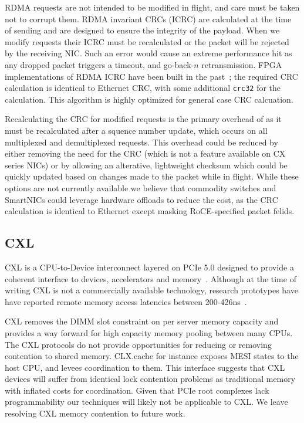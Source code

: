 RDMA requests are not intended to be modified in flight, and care must
be taken not to corrupt them. RDMA invariant CRCs (ICRC) are
calculated at the time of sending and are designed to ensure the
integrity of the payload. When we modify requests their ICRC must be
recalculated or the packet will be rejected by the receiving NIC. Such
an error would cause an extreme performance hit as any dropped packet
triggers a timeout, and go-back-$n$ retransmission.  FPGA
implementations of RDMA ICRC have been built in the
past~\cite{Mansour_2019}; the required CRC calculation is identical to
Ethernet CRC, with some additional \texttt{crc32} for the
calculation. This algorithm is highly optimized for general case CRC
calcuation.

Recalculating the CRC for modified requests is the primary overhead of
{\sword} as it must be recalculated after a squence number update,
which occurs on all multiplexed and demultiplexed requests. This
overhead could be reduced by either removing the need for the CRC
(which is not a feature available on CX series NICs) or by allowing an
alterative, lightweight checksum which could be quickly updated based
on changes made to the packet while in flight. While these options are
not currently available we believe that commodity switches and
SmartNICs could leverage hardware offloads to reduce the cost, as the
CRC calculation is identical to Ethernet except masking
RoCE-specified packet felids.


\subsection{CXL} 
\label{sec:cxl}

CXL is a CPU-to-Device interconnect layered on PCIe 5.0 designed to
provide a coherent interface to devices, accelerators and
memory~\cite{cxl-spec}.  Although at the time of writing CXL is not a
commercially available technology, research prototypes have have
reported remote memory access latencies between
200-426ns~\cite{direct-cxl,microsoft-cxl-first-gen,facebook-cxl-tpp}.

CXL removes the DIMM slot constraint on per server memory capacity and provides
a way forward for high capacity memory pooling between many CPUs. The CXL
protocols do not provide opportunities for reducing or removing contention to
shared memory.  CLX.cache for instance exposes MESI states to the host CPU, and
levees coordination to them. This interface suggests that CXL devices will
suffer from identical lock contention problems as traditional memory with
inflated costs for coordination. Given that PCIe root complexes lack
programmability our techniques will likely not be applicable to CXL. We leave
resolving CXL memory contention to future work.
